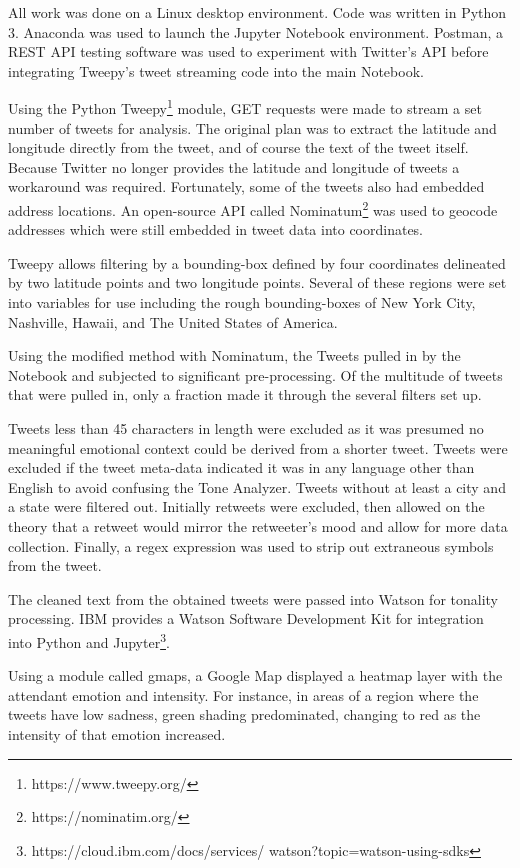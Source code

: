 \documentclass[12pt, oneside]{article}
\begin{document}
All work was done on a Linux desktop environment. Code was written in Python
3. Anaconda was used to launch the Jupyter Notebook environment. Postman, a
REST API testing software was used to experiment with Twitter's
API\cite{Postman} before integrating Tweepy's tweet streaming code into the
main Notebook.

Using the Python Tweepy\footnote{https://www.tweepy.org/} module, GET requests
were made to stream a set number of
tweets for analysis. The original plan was to extract the latitude and
longitude directly from the tweet, and of course
the text of the tweet itself. Because Twitter no longer provides the latitude
and longitude of tweets a workaround was required. Fortunately, some of the
tweets also had embedded address locations. An open-source API called
Nominatum\footnote{https://nominatim.org/} was used to geocode
addresses which were still embedded in tweet data into coordinates.

Tweepy allows filtering by a bounding-box defined by four coordinates
delineated by two latitude points and two longitude points. Several of these
regions were set into variables for use including the rough bounding-boxes of
New York City, Nashville, Hawaii, and The United States of America.

Using the modified method with Nominatum, the Tweets pulled in by the Notebook
and subjected to significant pre-processing. Of the multitude of tweets that
were pulled in, only a fraction made it through the several filters set up.

Tweets less than 45 characters in length were excluded as it was presumed no
meaningful emotional context could be derived from a shorter tweet.
Tweets were excluded if the tweet meta-data indicated it was in any language
other than English to avoid confusing the Tone Analyzer. Tweets without at
least a city and a state were filtered out. Initially retweets were excluded,
then allowed on the theory that a retweet would mirror the retweeter's mood and
allow for more data collection. Finally, a regex expression was used to strip
out extraneous symbols from the tweet.

The cleaned text from the obtained tweets were passed into Watson for tonality
processing. IBM provides a Watson Software Development Kit for integration into
Python and Jupyter\footnote{https://cloud.ibm.com/docs/services/
watson?topic=watson-using-sdks}.

Using a module called gmaps, a Google Map displayed a heatmap layer with the
attendant emotion and
intensity. For instance, in areas of a region where the tweets have low
sadness, green shading predominated, changing to red as the intensity of
that emotion increased.
\end{document}
